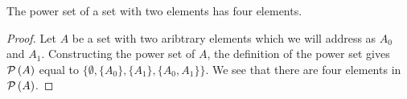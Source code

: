 \documentclass[main.tex]{subfiles}
\begin{document}
\subproblem{}\label{8a}

\begin{thm}[\(\card{A} = 2 \implies \card{\powerset{A}} = 4\)]
	The power set of a set with two elements has four elements.
\end{thm}
\begin{proof}
	Let \(A\) be a set with two aribtrary elements which we will address as
	\(A_0\) and \(A_1\). Constructing the power set of \(A\), the definition
	of the power set gives \(\mathcal{P}\left(A\right)\) equal to
	\(\{\emptyset, \{A_0\}, \{A_1\}, \{A_0, A_1\}\}\). We see that there are
	four elements in \(\mathcal{P}\left(A\right)\).
\end{proof}
\end{document}
